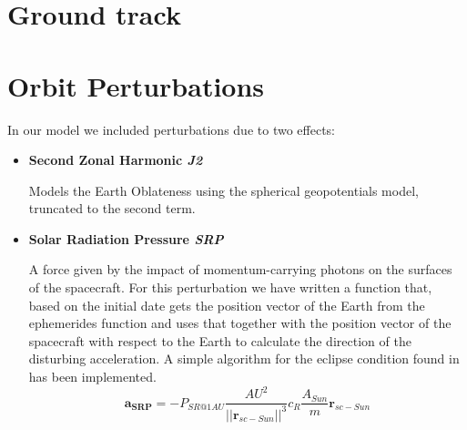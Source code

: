 \documentclass[11pt,a4paper]{report}
\renewcommand{\vec}[1]{\mathbf{#1}}
\begin{document}
\section{Ground track}
\begin{figure}[H]
\centering
{}
\end{figure}
\begin{figure}[H]
\centering
{}
\end{figure}
\begin{figure}[H]
\centering
{}
\end{figure}
\begin{figure}[H]
\centering
{}
\end{figure}
\begin{figure}[H]
\centering
{}
\end{figure}
\begin{figure}[H]
\centering
{}
\end{figure}

\section{Orbit Perturbations}
In our model we included perturbations due to two effects:
\begin{itemize}
    \item \textbf{Second Zonal Harmonic \emph{J2}} \par Models the Earth Oblateness using the spherical geopotentials model, truncated to the second term.
    \item \textbf{Solar Radiation Pressure \emph{SRP}} \par A force given by the impact of momentum-carrying photons on the surfaces of the spacecraft. For this perturbation we have written a function that, based on the initial date gets the position vector of the Earth from the ephemerides function and uses that together with the position vector of the spacecraft with respect to the Earth to calculate the direction of the disturbing acceleration. A simple algorithm for the eclipse condition found in \cite{SRP_Curtis} has been implemented.
    \begin{equation}
        \vec{a_{SRP}} = -P_{SR@1AU}\frac{AU^2}{||\vec{r}_{sc-Sun}||^3}c_R\frac{A_{Sun}}{m}\vec{r}_{sc-Sun}
    \end{equation}
\end{itemize}
\end{document}
